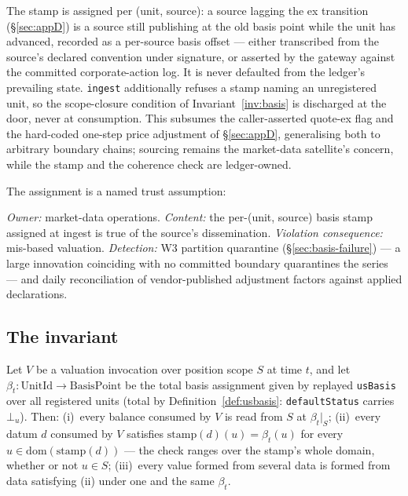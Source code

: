 \noindent
The stamp is assigned per (unit, source): a source lagging the ex transition
(\S\ref{sec:appD}) is a source still publishing at the old basis point while the unit
has advanced, recorded as a per-source basis offset --- either transcribed from the
source's declared convention under signature, or asserted by the gateway against the
committed corporate-action log. It is never defaulted from the ledger's prevailing
state. \texttt{ingest} additionally refuses a stamp naming an unregistered unit, so the
scope-closure condition of Invariant~\ref{inv:basis} is discharged at the door, never at
consumption. This subsumes the caller-asserted quote-ex flag and the hard-coded
one-step price adjustment of \S\ref{sec:appD}, generalising both to arbitrary boundary
chains; sourcing remains the market-data satellite's concern, while the stamp and the
coherence check are ledger-owned.

The assignment is a named trust assumption:

\begin{description}[style=nextline]
\item[TA-BASIS.] \emph{Owner:} market-data operations. \emph{Content:} the per-(unit,
source) basis stamp assigned at ingest is true of the source's dissemination.
\emph{Violation consequence:} mis-based valuation. \emph{Detection:} W3 partition
quarantine (\S\ref{sec:basis-failure}) --- a large innovation coinciding with no
committed boundary quarantines the series --- and daily reconciliation of
vendor-published adjustment factors against applied declarations.
\end{description}

\subsection{The invariant}
\label{sec:basis-invariant}

\begin{invariant}
\label{inv:basis}
Let $V$ be a valuation invocation over position scope $S$ at time $t$, and let
$\beta_t:\mathrm{UnitId}\to\mathrm{BasisPoint}$ be the total basis assignment given by
replayed \texttt{usBasis} over all registered units (total by
Definition~\ref{def:usbasis}: \texttt{defaultStatus} carries $\bot_u$). Then:
(i)~every balance consumed by $V$ is read from $S$ at $\beta_t|_S$;
(ii)~every datum $d$ consumed by $V$ satisfies
$\mathrm{stamp}(d)(u)=\beta_t(u)$ for every $u\in\mathrm{dom}(\mathrm{stamp}(d))$ ---
the check ranges over the stamp's whole domain, whether or not $u\in S$;
(iii)~every value formed from several data is formed from data satisfying (ii) under one
and the same $\beta_t$.
\end{invariant}

